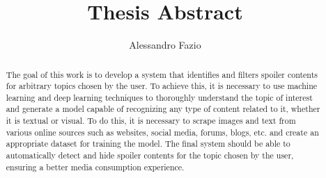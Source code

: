 \documentclass{article}
\begin{document}
    \title{Thesis Abstract}
    \author{Alessandro Fazio}
    \maketitle

\begin{abstract}
    The goal of this work is to develop a system that identifies and filters spoiler contents for arbitrary topics chosen by the user. To achieve this, it is necessary to use machine learning and deep learning techniques to thoroughly understand the topic of interest and generate a model capable of recognizing any type of content related to it, whether it is textual or visual. To do this, it is necessary to scrape images and text from various online sources such as websites, social media, forums, blogs, etc. and create an appropriate dataset for training the model. The final system should be able to automatically detect and hide spoiler contents for the topic chosen by the user, ensuring a better media consumption experience.
\end{abstract}
\end{document}
